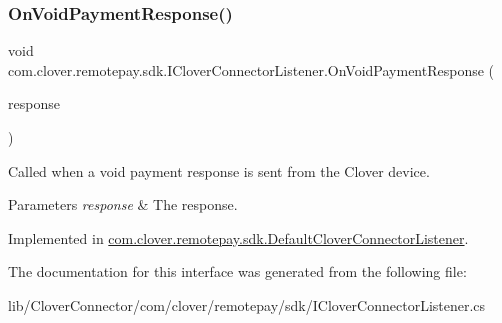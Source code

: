 \subsubsection{\texorpdfstring{On\+Void\+Payment\+Response()}{OnVoidPaymentResponse()}}
{\footnotesize\ttfamily void com.\+clover.\+remotepay.\+sdk.\+I\+Clover\+Connector\+Listener.\+On\+Void\+Payment\+Response (\begin{DoxyParamCaption}\item[{\hyperlink{classcom_1_1clover_1_1remotepay_1_1sdk_1_1_void_payment_response}{Void\+Payment\+Response}}]{response }\end{DoxyParamCaption})}



Called when a void payment response is sent from the Clover device. 


\begin{DoxyParams}{Parameters}
{\em response} & The response.\\
\hline
\end{DoxyParams}


Implemented in \hyperlink{classcom_1_1clover_1_1remotepay_1_1sdk_1_1_default_clover_connector_listener_acbffe77e24ba64632018d6c68dcdda33}{com.\+clover.\+remotepay.\+sdk.\+Default\+Clover\+Connector\+Listener}.



The documentation for this interface was generated from the following file\+:\begin{DoxyCompactItemize}
\item 
lib/\+Clover\+Connector/com/clover/remotepay/sdk/I\+Clover\+Connector\+Listener.\+cs\end{DoxyCompactItemize}
